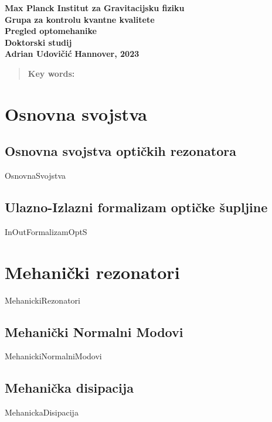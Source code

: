 \documentclass[10pt,leqno]{article}
\begin{document}
\begin{titlepage}
	\begin{center}
		{\large \textbf{Max Planck Institut za Gravitacijsku fiziku}} \\[0.1cm]
		{\large \textbf{Grupa za kontrolu kvantne kvalitete}}\\[0.1cm]
		{\large \textbf{Pregled optomehanike}} \\[0.1cm]
		{\LARGE\textbf{Doktorski studij}}\\[2.5cm]
		\vspace{2cm}
		{\LARGE \textbf{Adrian Udovičić}}
		\vfill
		\large\textbf{{Hannover, 2023} }
	\end{center}
\end{titlepage}


\newpage
{}
\begin{abstract}
	\textbf{Key words:}
\end{abstract}
\newpage
\tableofcontents
\hrulefill
\newpage

\section{Osnovna svojstva}
\subsection{Osnovna svojstva optičkih rezonatora}
{OsnovnaSvojstva}
\newpage
\subsection{Ulazno-Izlazni formalizam optičke šupljine}
{InOutFormalizamOptS}
\newpage
\section{Mehanički rezonatori}
{MehanickiRezonatori}
\subsection{Mehanički Normalni Modovi}
{MehanickiNormalniModovi}
\subsection{Mehanička disipacija}
{MehanickaDisipacija}
\newpage


\listoftables
\listoffigures
\end{document}
